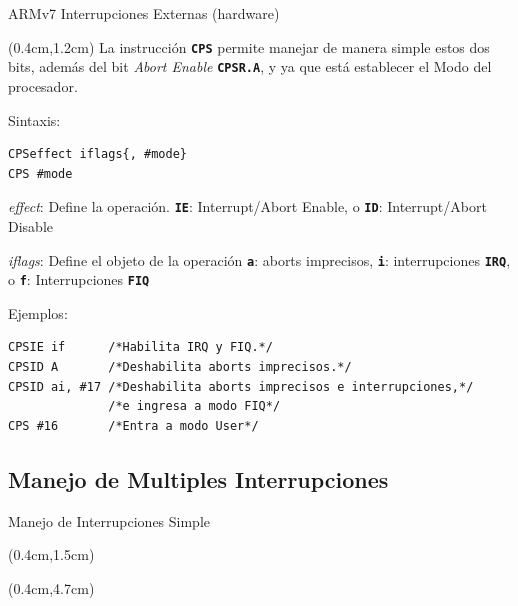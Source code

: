 \documentclass[usenames,table,xcolor={x11names},aspectratio=169]{beamer}
\begin{document}
\begin{frame}[t,fragile]{ARMv7 Interrupciones Externas (hardware)}
 \begin{textblock*}{\textwidth}(0.4cm,1.2cm) \justifying
La instrucción \textbf{\texttt{CPS}} permite manejar de manera simple estos dos bits, además del bit \textit{Abort Enable} \textbf{\texttt{CPSR.A}}, y ya que está establecer el Modo del procesador.

Sintaxis:\vspace{-0.3cm}
   \begin{lstlisting}[basicstyle=\scriptsize,escapechar=\@,numbers=none, frame=single, xleftmargin=20pt, xrightmargin=0pt,]
CPSeffect iflags{, #mode}
CPS #mode
   \end{lstlisting}
\vspace{-0.3cm} \textit{effect}:  Define la operación. \texttt{\textbf{IE}}: Interrupt/Abort Enable, o \texttt{\textbf{ID}}: Interrupt/Abort Disable

\textit{iflags}: Define el objeto de la operación \texttt{\textbf{a}}: aborts imprecisos, \texttt{\textbf{i}}: interrupciones \texttt{\textbf{IRQ}}, o \texttt{\textbf{f}}: Interrupciones \texttt{\textbf{FIQ}}

Ejemplos:\vspace{-0.3cm}
   \begin{lstlisting}[basicstyle=\scriptsize,escapechar=\@,numbers=none, frame=single, xleftmargin=20pt, xrightmargin=0pt,]
CPSIE if      /*Habilita IRQ y FIQ.*/
CPSID A       /*Deshabilita aborts imprecisos.*/
CPSID ai, #17 /*Deshabilita aborts imprecisos e interrupciones,*/
              /*e ingresa a modo FIQ*/
CPS #16       /*Entra a modo User*/
   \end{lstlisting}
 \end{textblock*}
\end{frame}

\subsection{Manejo de Multiples Interrupciones}
\begin{frame}[t]{Manejo de Interrupciones Simple}
 \begin{textblock*}{\textwidth}(0.4cm,1.5cm) \justifying
{}
 \end{textblock*}
 \begin{textblock*}{\textwidth}(0.4cm,4.7cm) \justifying
{}
 \end{textblock*}
\end{frame}
\end{document}
